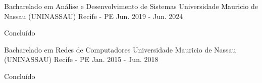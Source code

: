 

\begin{cventries}

  \cventry
    {Bacharelado em Análise e Desenvolvimento de Sistemas} %
    {Universidade Mauricio de Nassau (UNINASSAU)} %
    {Recife - PE} %
    {Jun. 2019 - Jun. 2024} %
    {
      \begin{cvitems} %
        \item{Concluído}
      \end{cvitems}
    }

  \cventry
    {Bacharelado em Redes de Computadores} %
    {Universidade Mauricio de Nassau (UNINASSAU)} %
    {Recife - PE} %
    {Jan. 2015 - Jun. 2018} %
    {
      \begin{cvitems} %
        \item{Concluído}
      \end{cvitems}
    }

\end{cventries}
